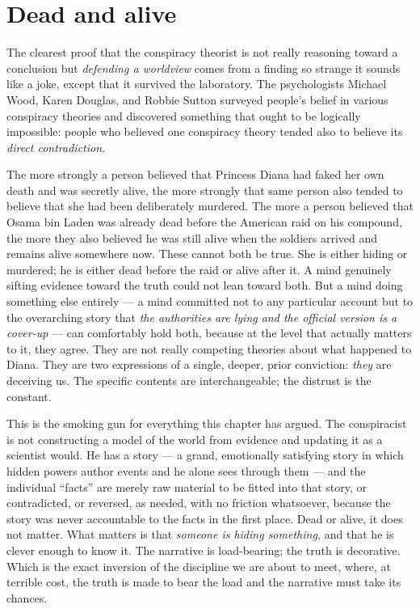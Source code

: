 \section*{Dead and alive}

The clearest proof that the conspiracy theorist is not really reasoning toward a conclusion but \emph{defending a worldview} comes from a finding so strange it sounds like a joke, except that it survived the laboratory. The psychologists Michael Wood, Karen Douglas, and Robbie Sutton surveyed people's belief in various conspiracy theories and discovered something that ought to be logically impossible: people who believed one conspiracy theory tended also to believe its \emph{direct contradiction.}

The more strongly a person believed that Princess Diana had faked her own death and was secretly alive, the more strongly that same person also tended to believe that she had been deliberately murdered. The more a person believed that Osama bin Laden was already dead before the American raid on his compound, the more they also believed he was still alive when the soldiers arrived and remains alive somewhere now. These cannot both be true. She is either hiding or murdered; he is either dead before the raid or alive after it. A mind genuinely sifting evidence toward the truth could not lean toward both. But a mind doing something else entirely — a mind committed not to any particular account but to the overarching story that \emph{the authorities are lying and the official version is a cover-up} — can comfortably hold both, because at the level that actually matters to it, they agree. They are not really competing theories about what happened to Diana. They are two expressions of a single, deeper, prior conviction: \emph{they} are deceiving us. The specific contents are interchangeable; the distrust is the constant.

This is the smoking gun for everything this chapter has argued. The conspiracist is not constructing a model of the world from evidence and updating it as a scientist would. He has a story — a grand, emotionally satisfying story in which hidden powers author events and he alone sees through them — and the individual ``facts'' are merely raw material to be fitted into that story, or contradicted, or reversed, as needed, with no friction whatsoever, because the story was never accountable to the facts in the first place. Dead or alive, it does not matter. What matters is that \emph{someone is hiding something,} and that he is clever enough to know it. The narrative is load-bearing; the truth is decorative. Which is the exact inversion of the discipline we are about to meet, where, at terrible cost, the truth is made to bear the load and the narrative must take its chances.

